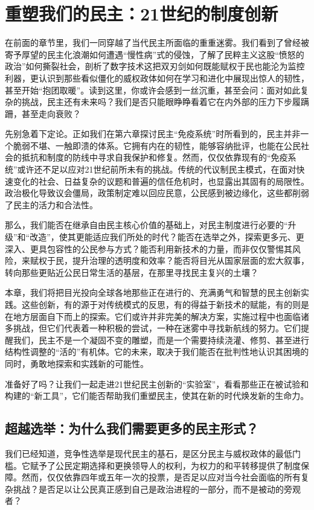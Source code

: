 \documentclass[UTF8, 10pt]{ctexbook}
\begin{document}
\chapter{重塑我们的民主：21世纪的制度创新}

\lettrine[lines=3]{在}{前面}的章节里，我们一同穿越了当代民主所面临的重重迷雾。我们看到了曾经被寄予厚望的民主化浪潮如何遭遇“慢性病”式的侵蚀，了解了民粹主义这股“愤怒的政治”如何撕裂社会，剖析了数字技术这把双刃剑如何既能赋权于民也能沦为监控利器，更认识到那些看似僵化的威权政体如何在学习和进化中展现出惊人的韧性，甚至开始“抱团取暖”。读到这里，你或许会感到一丝沉重，甚至会问：面对如此复杂的挑战，民主还有未来吗？我们是否只能眼睁睁看着它在内外部的压力下步履蹒跚，甚至走向衰败？

先别急着下定论。正如我们在第六章探讨民主“免疫系统”时所看到的，民主并非一个脆弱不堪、一触即溃的体系。它拥有内在的韧性，能够容纳批评，也能在公民社会的抵抗和制度的防线中寻求自我保护和修复。然而，仅仅依靠现有的“免疫系统”或许还不足以应对21世纪前所未有的挑战。传统的代议制民主模式，在面对快速变化的社会、日益复杂的议题和普遍的信任危机时，也显露出其固有的局限性。政治极化导致议会僵局，政策制定难以回应民意，公民感到被边缘化，这些都削弱了民主的活力和合法性。

那么，我们能否在继承自由民主核心价值的基础上，对民主制度进行必要的“升级”和“改造”，使其更能适应我们所处的时代？能否在选举之外，探索更多元、更深入、更具包容性的公民参与方式？能否利用新技术的力量，而非仅仅警惕其风险，来赋权于民，提升治理的透明度和效率？能否将目光从国家层面的宏大叙事，转向那些更贴近公民日常生活的基层，在那里寻找民主复兴的土壤？

本章，我们将把目光投向全球各地那些正在进行的、充满勇气和智慧的民主创新实践。这些创新，有的源于对传统模式的反思，有的得益于新技术的赋能，有的则是在地方层面自下而上的探索。它们或许并非完美的解决方案，实施过程中也面临诸多挑战，但它们代表着一种积极的尝试，一种在迷雾中寻找新航线的努力。它们提醒我们，民主不是一个凝固不变的雕塑，而是一个需要持续浇灌、修剪、甚至进行结构性调整的“活的”有机体。它的未来，取决于我们能否在批判性地认识其困境的同时，勇敢地探索和实践新的可能性。

准备好了吗？让我们一起走进21世纪民主创新的“实验室”，看看那些正在被试验和构建的“新工具”，它们能否帮助我们重塑民主，使其在新的时代焕发新的生命力。

\section{超越选举：为什么我们需要更多的民主形式？}
\lettrine[lines=2]{我}{们}已经知道，竞争性选举是现代民主的基石，是区分民主与威权政体的最低门槛。它赋予了公民定期选择和更换领导人的权利，为权力的和平转移提供了制度保障。然而，仅仅依靠四年或五年一次的投票，是否足以应对当今社会面临的所有复杂挑战？是否足以让公民真正感到自己是政治进程的一部分，而不是被动的旁观者？
\end{document}
